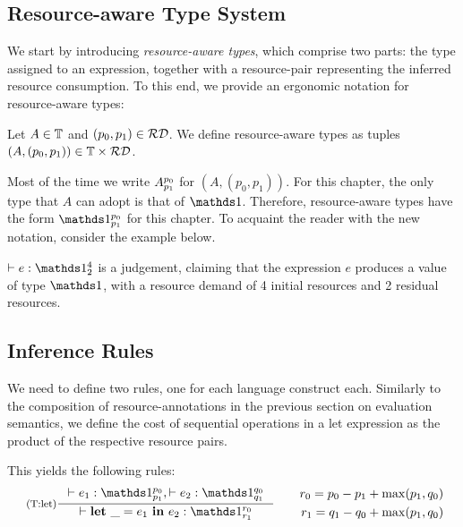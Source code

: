 \subsection{Resource-aware Type System}

We start by introducing \emph{resource-aware types}, which comprise two parts: the type assigned to an expression, together with a resource-pair representing the inferred resource consumption. To this end, we provide an ergonomic notation for resource-aware types:

\begin{definition}\label{def:ra-type}
   Let \(A \in \mathbb{T}\) and \((p_0, p_1) \in \mathcal{RD}\). We define resource-aware types as tuples \((A, (p_0, p_1)) \in \mathbb{T} \times \mathcal{RD}\).
\end{definition}

Most of the time we write \(A ^{p_0}_{p_1}\) for \((A, (p_0, p_1))\). For this chapter, the only type that \(A\) can adopt is that of \(\unit\). Therefore, resource-aware types have the form \(\ratype{\unit}{p_0}{p_1}\) for this chapter. To acquaint the reader with the new notation, consider the example below.

\begin{example}
   \(\typing{}{e}{\ratype{\unit}{4}{2}}\) is a judgement, claiming that the expression \(e\) produces a value of type \(\unit\), with a resource demand of 4 initial resources and 2 residual resources.
\end{example}

\subsection{Inference Rules}

We need to define two rules, one for each language construct each. Similarly to the composition of resource-annotations in the previous section on evaluation semantics, we define the cost of sequential operations in a let expression as the product of the respective resource pairs.

This yields the following rules:
\[
   \label{def:tr-let-4}
   \vcenter{\hbox{
      \inference[(T:let)]
      {\typing{}{e_1}{\ratype{\unit}{p_0}{p_1}},  \typing{}{e_2}{\ratype{\unit}{q_0}{q_1}}}
      {\typing{}{\letexp{\_}{e_1}{e_2}}{\ratype{\unit}{r_0}{r_1}}}
}}\qquad \begin{aligned}
      r_0 = p_0 - p_1 + \max(p_1, q_0) \\
      r_1 = q_1 - q_0 + \max(p_1, q_0)
   \end{aligned}
\]

